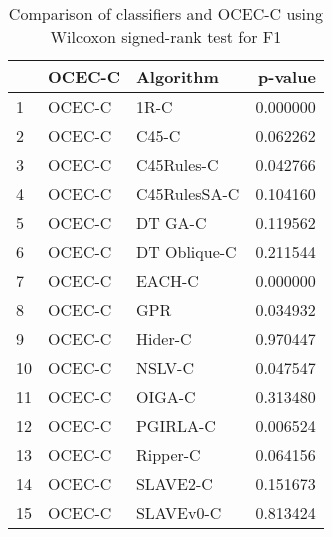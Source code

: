\begin{table}
\footnotesize
\caption{Comparison of classifiers and OCEC-C using Wilcoxon signed-rank test for F1}
\label{tab:OCEC-C wilcoxon F1 comparison}
\begin{tabular}{lllr}
\hline
 & OCEC-C & Algorithm & p-value \\
\hline
1 & OCEC-C & 1R-C & 0.000000 \\
2 & OCEC-C & C45-C & 0.062262 \\
3 & OCEC-C & C45Rules-C & 0.042766 \\
4 & OCEC-C & C45RulesSA-C & 0.104160 \\
5 & OCEC-C & DT GA-C & 0.119562 \\
6 & OCEC-C & DT Oblique-C & 0.211544 \\
7 & OCEC-C & EACH-C & 0.000000 \\
8 & OCEC-C & GPR & 0.034932 \\
9 & OCEC-C & Hider-C & 0.970447 \\
10 & OCEC-C & NSLV-C & 0.047547 \\
11 & OCEC-C & OIGA-C & 0.313480 \\
12 & OCEC-C & PGIRLA-C & 0.006524 \\
13 & OCEC-C & Ripper-C & 0.064156 \\
14 & OCEC-C & SLAVE2-C & 0.151673 \\
15 & OCEC-C & SLAVEv0-C & 0.813424 \\
\hline
\end{tabular}
\end{table}
